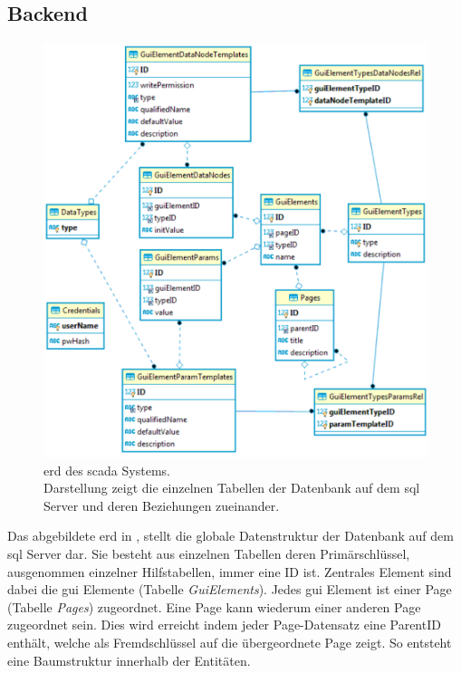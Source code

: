 \subsection{Backend}\label{subsec:dataBackend}
\begin{figure}[htb]
  \centering
  \includegraphics[width=\textwidth]{content/hauptteil/systemEntwurf/res/erd.pdf}
  \caption[\acs{erd} des \acs{scada} Systems]{\acs{erd} des \ac{scada} Systems.\\
    Darstellung zeigt die einzelnen Tabellen der Datenbank auf dem \ac{sql} Server und deren Beziehungen zueinander.}
  \label{img:erd}
\end{figure}
Das abgebildete \ac{erd} in , stellt die globale Datenstruktur der Datenbank auf dem \ac{sql} Server dar.
Sie besteht aus einzelnen Tabellen deren Primärschlüssel, ausgenommen einzelner Hilfstabellen, immer eine ID ist.
Zentrales Element sind dabei die \ac{gui} Elemente (Tabelle \emph{GuiElements}). Jedes \ac{gui} Element ist einer Page (Tabelle \emph{Pages}) zugeordnet. 
Eine Page kann wiederum einer anderen Page zugeordnet sein. 
Dies wird erreicht indem jeder Page-Datensatz eine ParentID enthält, welche als Fremdschlüssel auf die übergeordnete Page zeigt. 
So entsteht eine Baumstruktur innerhalb der Entitäten.
